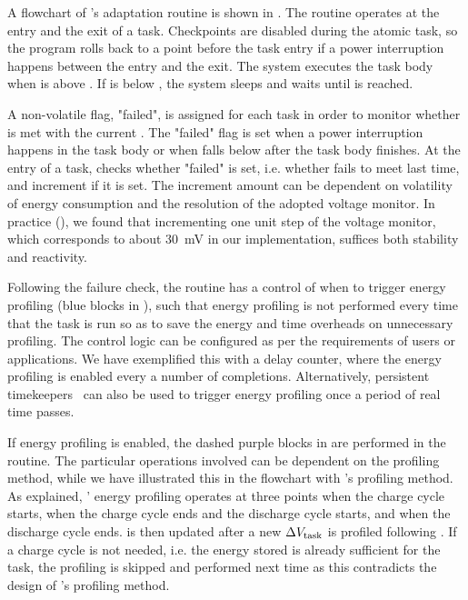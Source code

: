 A flowchart of \nn{}'s adaptation routine is shown in .
The routine operates at the entry and the exit of a task.
Checkpoints are disabled during the atomic task, so the program rolls back to a point before the task entry if a power interruption happens between the entry and the exit.
The system executes the task body when  is above . If  is below , the system sleeps and waits until  is reached.

A non-volatile flag, "failed", is assigned for each task in order to monitor whether  is met with the current .
The "failed" flag is set when a power interruption happens in the task body or when  falls below  after the task body finishes. 
At the entry of a task, \nn{} checks whether "failed" is set, i.e. whether  fails to meet  last time, and increment  if it is set. 
The increment amount can be dependent on volatility of energy consumption and the resolution of the adopted voltage monitor. 
In practice (), we found that incrementing one unit step of the voltage monitor, which corresponds to about \SI{30}{\milli\volt} in our implementation, suffices both stability and reactivity. 

Following the failure check, the routine has a control of when to trigger energy profiling (blue blocks in ), such that energy profiling is not performed every time that the task is run so as to save the energy and time overheads on unnecessary profiling. 
The control logic can be configured as per the requirements of users or applications. 
We have exemplified this with a delay counter, where the energy profiling is enabled every a number of completions. 
Alternatively, persistent timekeepers~\cite{winkel2020reliable, deep2020harc, hester2016persistent} can also be used to trigger energy profiling once a period of real time passes.

If energy profiling is enabled, the dashed purple blocks in  are performed in the routine. 
The particular operations involved can be dependent on the profiling method, while we have illustrated this in the flowchart with \nn{}'s profiling method. 
As explained, \nn{}' energy profiling operates at three points when the charge cycle starts, when the charge cycle ends and the discharge cycle starts, and when the discharge cycle ends. 
 is then updated after a new $\Delta V_{\text{task}}$ is profiled following . 
If a charge cycle is not needed, i.e. the energy stored is already sufficient for the task, the profiling is skipped and performed next time as this contradicts the design of \nn{}'s profiling method.

